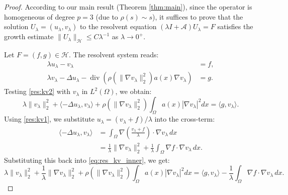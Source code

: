 \documentclass[11pt,reqno]{amsart}
\theoremstyle{remark}
\begin{document}
\begin{proof}
    According to our main result (Theorem \ref{thm:main}), since the operator is homogeneous of degree $p=3$ (due to $\rho(s) \sim s$), it suffices to prove that the solution $U_\lambda=(u_\lambda, v_\lambda)$ to the resolvent equation $(\lambda I + \mathcal{A})U_\lambda = F$ satisfies the growth estimate $\|U_\lambda\|_{\mathcal{H}} \le C \lambda^{-1}$ as $\lambda \to 0^+$.

    Let $F=(f,g) \in \mathcal{H}$. The resolvent system reads:
    \begin{align}
        \lambda u_\lambda - v_\lambda &= f, \label{res:kv1} \\
        \lambda v_\lambda - \Delta u_\lambda - \operatorname{div}(\rho(\|\nabla v_\lambda\|_2^2) a(x) \nabla v_\lambda) &= g. \label{res:kv2}
    \end{align}
    Testing \eqref{res:kv2} with $v_\lambda$ in $L^2(\Omega)$, we obtain:
    \begin{equation}\label{eq:res_kv_inner}
        \lambda \|v_\lambda\|_2^2 + \langle -\Delta u_\lambda, v_\lambda \rangle + \rho(\|\nabla v_\lambda\|_2^2) \int_\Omega a(x) |\nabla v_\lambda|^2 dx = \langle g, v_\lambda \rangle.
    \end{equation}
    Using \eqref{res:kv1}, we substitute $u_\lambda = (v_\lambda+f)/\lambda$ into the cross-term:
    \begin{align*}
        \langle -\Delta u_\lambda, v_\lambda \rangle &= \int_\Omega \nabla \left(\frac{v_\lambda+f}{\lambda}\right) \cdot \nabla v_\lambda \, dx \\
        &= \frac{1}{\lambda}\|\nabla v_\lambda\|_2^2 + \frac{1}{\lambda}\int_\Omega \nabla f \cdot \nabla v_\lambda \, dx.
    \end{align*}
    Substituting this back into \eqref{eq:res_kv_inner}, we get:
    \begin{equation}
        \lambda \|v_\lambda\|_2^2 + \frac{1}{\lambda}\|\nabla v_\lambda\|_2^2 + \rho(\|\nabla v_\lambda\|_2^2) \int_\Omega a(x) |\nabla v_\lambda|^2 dx = \langle g, v_\lambda \rangle - \frac{1}{\lambda}\int_\Omega \nabla f \cdot \nabla v_\lambda \, dx.
    \end{equation}


\end{proof}
\end{document}
